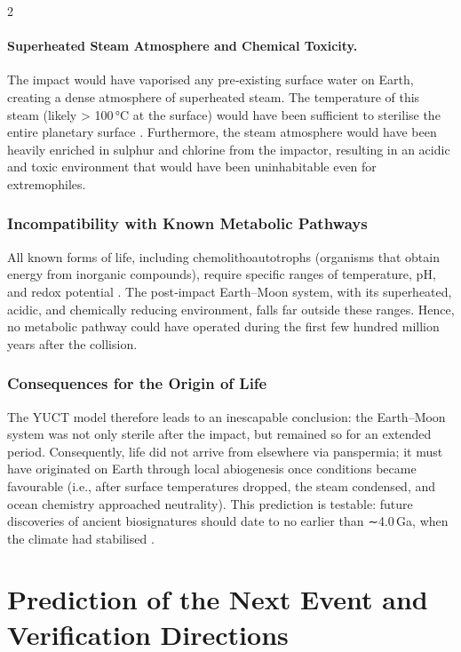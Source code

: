 \documentclass[11pt,a4paper]{article}
\begin{document}
\begin{multicols}{2}
		\paragraph{Superheated Steam Atmosphere and Chemical Toxicity.}
		The impact would have vaporised any pre‑existing surface water on Earth, creating a dense atmosphere of superheated steam. The temperature of this steam (likely > 100 °C at the surface) would have been sufficient to sterilise the entire planetary surface \cite{Zahnle2015}. Furthermore, the steam atmosphere would have been heavily enriched in sulphur and chlorine from the impactor, resulting in an acidic and toxic environment that would have been uninhabitable even for extremophiles.
		
		\subsubsection{Incompatibility with Known Metabolic Pathways}
		
		All known forms of life, including chemolithoautotrophs (organisms that obtain 
		energy from inorganic compounds), require specific ranges of temperature, pH, and 
		redox potential \cite{Chemolithoautotroph}. The post‑impact Earth–Moon system, with its superheated, acidic, 
		and chemically reducing environment, falls far outside these ranges. Hence, no 
		metabolic pathway could have operated during the first few hundred million years 
		after the collision.
		
		\subsubsection{Consequences for the Origin of Life}
		
		The YUCT model therefore leads to an inescapable conclusion: the Earth–Moon 
		system was not only sterile after the impact, but remained so for an extended 
		period. Consequently, life did not arrive from elsewhere via panspermia; it must 
		have originated on Earth through local abiogenesis once conditions became 
		favourable (i.e., after surface temperatures dropped, the steam condensed, and 
		ocean chemistry approached neutrality). This prediction is testable: future 
		discoveries of ancient biosignatures should date to no earlier than ∼4.0 Ga, 
		when the climate had stabilised \cite{AbiogenesisReview}.
		
		\section{Prediction of the Next Event and Verification Directions}
		

\end{multicols}
\end{document}
